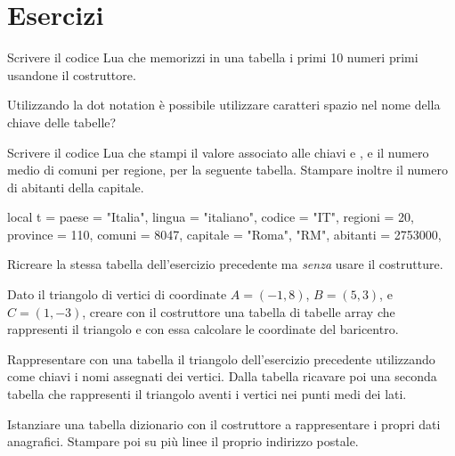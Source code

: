 \section{Esercizi}

\begin{Exercise}[label={tab-01}]
Scrivere il codice Lua che memorizzi in una tabella i primi 10 numeri primi
usandone il costruttore.
\end{Exercise}

\begin{Exercise}[label={tab-02}]
Utilizzando la dot notation è possibile utilizzare caratteri spazio nel nome
della chiave delle tabelle?
\end{Exercise}

\begin{Exercise}[label={tab-03}]
Scrivere il codice Lua che stampi il valore associato alle chiavi  e
, e il numero medio di comuni per regione, per la seguente tabella.
Stampare inoltre il numero di abitanti della capitale.
\begin{lines}
local t = {
    paese = "Italia",
    lingua = "italiano",
    codice = "IT",
    regioni = 20,
    province = 110,
    comuni = 8047,
    capitale = {"Roma", "RM", abitanti = 2753000},
}
\end{lines}
\end{Exercise}

\begin{Exercise}[label={tab-04}]
Ricreare la stessa tabella  dell'esercizio precedente ma \emph{senza}
usare il costrutture.
\end{Exercise}

\begin{Exercise}[label={tab-05}]
Dato il triangolo di vertici di coordinate \( A = \left( -1, 8\right) \), \( B =
\left( 5, 3\right) \), e \( C = \left( 1, -3\right) \), creare con il
costruttore una tabella di tabelle array che rappresenti il triangolo e con essa
calcolare le coordinate del baricentro.
\end{Exercise}

\begin{Exercise}[label={tab-06}]
Rappresentare con una tabella il triangolo dell'esercizio precedente utilizzando
come chiavi i nomi assegnati dei vertici. Dalla tabella ricavare poi una seconda
tabella che rappresenti il triangolo aventi i vertici nei punti medi dei lati.
\end{Exercise}

\begin{Exercise}[label={tab-07}]
Istanziare una tabella dizionario con il costruttore a rappresentare i propri
dati anagrafici. Stampare poi su più linee il proprio indirizzo postale.
\end{Exercise}

